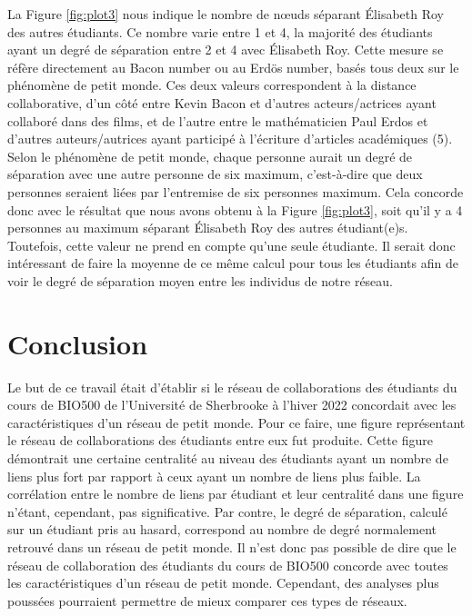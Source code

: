 \documentclass[9pt,twocolumn,twoside,]{pnas-new}
\begin{document}
La Figure \ref{fig:plot3} nous indique le nombre de nœuds séparant
Élisabeth Roy des autres étudiants. Ce nombre varie entre 1 et 4, la
majorité des étudiants ayant un degré de séparation entre 2 et 4 avec
Élisabeth Roy. Cette mesure se réfère directement au Bacon number ou au
Erdös number, basés tous deux sur le phénomène de petit monde. Ces deux
valeurs correspondent à la distance collaborative, d'un côté entre Kevin
Bacon et d'autres acteurs/actrices ayant collaboré dans des films, et de
l'autre entre le mathématicien Paul Erdos et d'autres auteurs/autrices
ayant participé à l'écriture d'articles académiques (5). Selon le
phénomène de petit monde, chaque personne aurait un degré de séparation
avec une autre personne de six maximum, c'est-à-dire que deux personnes
seraient liées par l'entremise de six personnes maximum. Cela concorde
donc avec le résultat que nous avons obtenu à la Figure \ref{fig:plot3},
soit qu'il y a 4 personnes au maximum séparant Élisabeth Roy des autres
étudiant(e)s. Toutefois, cette valeur ne prend en compte qu'une seule
étudiante. Il serait donc intéressant de faire la moyenne de ce même
calcul pour tous les étudiants afin de voir le degré de séparation moyen
entre les individus de notre réseau.

\hypertarget{conclusion}{%
\section{Conclusion}\label{conclusion}}

Le but de ce travail était d'établir si le réseau de collaborations des
étudiants du cours de BIO500 de l'Université de Sherbrooke à l'hiver
2022 concordait avec les caractéristiques d'un réseau de petit monde.
Pour ce faire, une figure représentant le réseau de collaborations des
étudiants entre eux fut produite. Cette figure démontrait une certaine
centralité au niveau des étudiants ayant un nombre de liens plus fort
par rapport à ceux ayant un nombre de liens plus faible. La corrélation
entre le nombre de liens par étudiant et leur centralité dans une figure
n'étant, cependant, pas significative. Par contre, le degré de
séparation, calculé sur un étudiant pris au hasard, correspond au nombre
de degré normalement retrouvé dans un réseau de petit monde. Il n'est
donc pas possible de dire que le réseau de collaboration des étudiants
du cours de BIO500 concorde avec toutes les caractéristiques d'un réseau
de petit monde. Cependant, des analyses plus poussées pourraient
permettre de mieux comparer ces types de réseaux.
\end{document}
